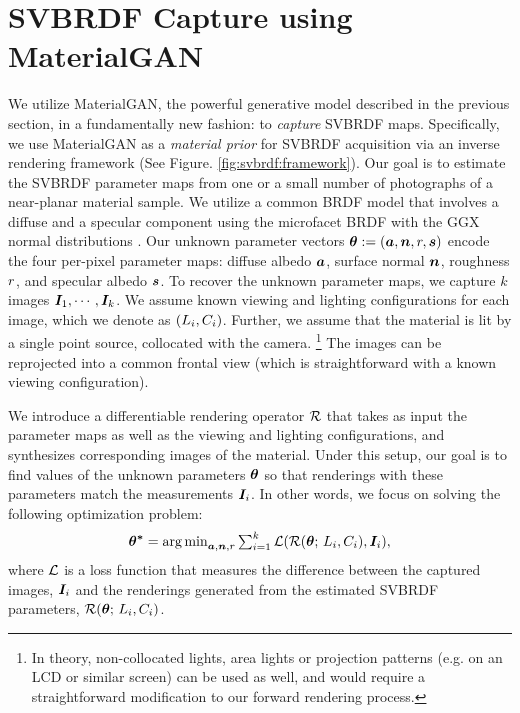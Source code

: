 \section{SVBRDF Capture using MaterialGAN}
\label{sec:svbrdf:framework}



We utilize MaterialGAN, the powerful generative model described in the previous section, in a fundamentally new fashion: to \emph{capture} SVBRDF maps.
Specifically, we use MaterialGAN as a \emph{material prior} for SVBRDF acquisition via an inverse rendering framework (See Figure. \ref{fig:svbrdf:framework}).
Our goal is to estimate the SVBRDF parameter maps from one or a small number of photographs of a near-planar material sample.
We utilize a common BRDF model that involves a diffuse and a specular component using the microfacet BRDF with the GGX normal distributions \cite{walter2007microfacet}.
Our unknown parameter vectors $\bm{\theta} := (\bm{a},\bm{n},r,\bm{s})$ encode the four per-pixel parameter maps: diffuse albedo $\bm{a}$, surface normal $\bm{n}$, roughness $r$, and specular albedo $\bm{s}$.
To recover the unknown parameter maps, we capture $k$ images $\bm{I}_1, \cdots, \bm{I}_k$.
We assume known viewing and lighting configurations for each image, which we denote as $(L_i, C_i)$.
Further, we assume that the material is lit by a single point source, collocated with the camera.
\footnote{
	In theory, non-collocated lights, area lights or projection patterns (e.g. on an LCD or similar screen) can be used as well, and would require a straightforward modification to our forward rendering process.
}
The images can be reprojected into a common frontal view (which is straightforward with a known viewing configuration).

We introduce a differentiable rendering operator $\mathcal{R}$ that takes as input the parameter maps as well as the viewing and lighting configurations, and synthesizes corresponding images of the material.
Under this setup, our goal is to find values of the unknown parameters $\bm{\theta}$ so that renderings with these parameters match the measurements $\bm{I}_i$.
In other words, we focus on solving the following optimization problem:
\begin{equation}
	\label{eq:opt1}
	\bm{\theta^{*}} = \textstyle\operatorname*{arg\,min}_{\bm{a}, \bm{n}, r} \sum_{i=1}^k \mathcal{L}(\mathcal{R}(\bm{\theta}; \,L_i, C_i), \bm{I}_i),
\end{equation}
where $\mathcal{L}$ is a loss function that measures the difference between the captured images, $\bm{I}_i$ and the renderings generated from the estimated SVBRDF parameters, $\mathcal{R}(\bm{\theta}; \,L_i, C_i)$.


